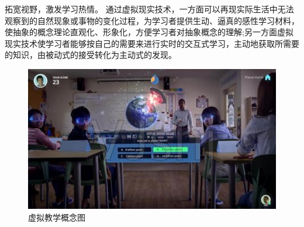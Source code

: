 \documentclass{imutthesis}
\begin{document}
拓宽视野，激发学习热情。
通过虚拟现实技术，一方面可以再现实际生活中无法观察到的自然现象或事物的变化过程，为学习者提供生动、逼真的感性学习材料，使抽象的概念理论直观化、形象化，方便学习者对抽象概念的理解;另一方面虚拟现实技术使学习者能够按自己的需要来进行实时的交互式学习，主动地获取所需要的知识，由被动式的接受转化为主动式的发现。

\begin{figure}[htbp]
    \centering
    \includegraphics{第三世界.jpg}
    \caption{虚拟教学概念图}
\end{figure}
\end{document}
